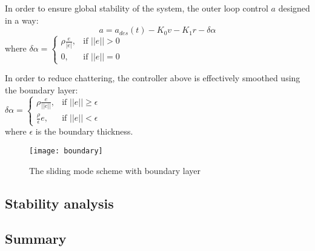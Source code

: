 In order to ensure global stability of the system, the outer loop control $a$
designed in a way:
$$
    a = a_{des}(t) - K_0v - K_1 r - \delta \alpha
$$
where $\delta \alpha = \begin{cases}
        \rho\frac{e}{|e|} , & \text{if } ||e|| > 0 \\
        0,                  & \text{if } ||e|| = 0
    \end{cases}$


In order to reduce chattering, the controller above is effectively smoothed using
the boundary layer:\\
$\delta \alpha = \begin{cases}
        \rho\frac{e}{|| e ||} , & \text{if } ||e|| \geq \epsilon \\
        \frac{\rho}{\epsilon}e, & \text{if } ||e|| < \epsilon
    \end{cases}$\\
where $\epsilon$ is the boundary thickness.

\begin{figure}[H]
    \centering\texttt{[image: boundary]}
    \caption{The sliding mode scheme with boundary layer}
    \label{image:boundary}
\end{figure}

\subsection{Stability analysis}


\subsection{Summary}





